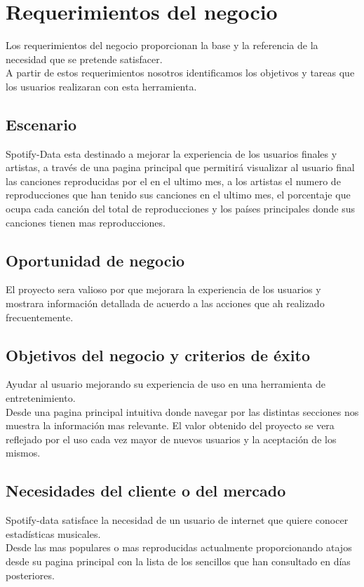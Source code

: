 \documentclass[12pt,a4paper]{book}
\begin{document}
\chapter{Requerimientos del negocio}
Los requerimientos del negocio proporcionan la base y la referencia de la necesidad que se pretende satisfacer.\\
A partir de estos requerimientos nosotros identificamos los objetivos y tareas que los usuarios realizaran con esta herramienta.
\section{Escenario}
\vspace{0.5 cm}
Spotify-Data esta destinado a mejorar la experiencia de los usuarios finales y artistas, a través de una pagina principal que permitirá visualizar al usuario final las canciones reproducidas por el en el ultimo mes, a los artistas el numero de reproducciones que han tenido sus canciones en el ultimo mes, el porcentaje que ocupa cada canción del total de reproducciones y los países principales donde sus canciones tienen mas reproducciones.
\section{Oportunidad de negocio}
\vspace{0.5 cm}
El proyecto sera valioso por que mejorara la experiencia de los usuarios y mostrara información detallada de acuerdo a las acciones que ah realizado frecuentemente.
\section{Objetivos del negocio y criterios de éxito}
\vspace{0.5 cm}
Ayudar al usuario mejorando su experiencia de uso en una herramienta de entretenimiento.\\ 
Desde una pagina principal intuitiva donde navegar por las distintas secciones nos muestra la información mas relevante. 
El valor obtenido del proyecto se vera reflejado por el uso cada vez mayor de nuevos usuarios y la aceptación de los mismos.
\newpage
\vspace{0.5 cm}
\section{Necesidades del cliente o del mercado}
\vspace{0.5 cm}
Spotify-data satisface la necesidad de un usuario de internet que quiere conocer estadísticas musicales.\\
Desde las mas populares o mas reproducidas actualmente proporcionando atajos desde su pagina principal con la lista de los sencillos que han consultado en días posteriores.\\
\end{document}
